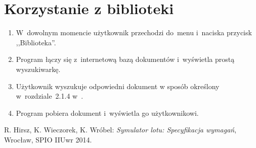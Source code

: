 \documentclass{mwrep}
\begin{document}
\section{Korzystanie z biblioteki}
\begin{enumerate}
  \item W~dowolnym momencie użytkownik przechodzi do~menu i~naciska przycisk ,,Biblioteka''.
  \item Program łączy się z~internetową bazą dokumentów i~wyświetla prostą wyszukiwarkę.
  \item Użytkownik wyszukuje odpowiedni dokument w sposób określony w~rozdziale~2.1.4 w~\cite{WYM}.
  \item Program pobiera dokument i~wyświetla go użytkownikowi.
\end{enumerate}

\begin{thebibliography}{9}
   R. Hirsz, K. Wieczorek, K. Wróbel: \textit{Symulator lotu: Specyfikacja wymagań}, Wrocław, SPIO IIUwr 2014.
\end{thebibliography}
\end{document}
